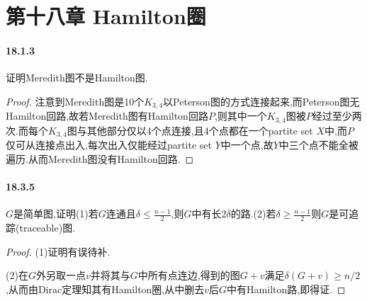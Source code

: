 \documentclass[11pt]{article}
\begin{document}
\section{第十八章\; Hamilton圈}
\paragraph{18.1.3}证明Meredith图不是Hamilton图. %
\begin{proof}
    注意到Meredith图是10个$K_{3,4}$以Peterson图的方式连接起来,而Peterson图无Hamilton回路,故若Meredith图有Hamilton回路$P$,则其中一个$K_{3,4}$图被$P$经过至少两次.而每个$K_{3,4}$图与其他部分仅以4个点连接,且4个点都在一个partite set $X$中,而$P$仅可从连接点出入,每次出入仅能经过partite set $Y$中一个点,故$Y$中三个点不能全被遍历.从而Meredith图没有Hamilton回路.
\end{proof}

\paragraph{18.3.5}$G$是简单图,证明(1)若$G$连通且$\delta\leq \frac{n-1}{2}$,则$G$中有长$2\delta$的路.(2)若$\delta\geq \frac{n-1}{2}$则$G$是可追踪(traceable)图.
\begin{proof}
    (1)证明有误待补.

    (2)在$G$外另取一点$v$并将其与$G$中所有点连边,得到的图$G+v$满足$\delta(G+v)\geq n/2$,从而由Dirac定理知其有Hamilton圈,从中删去$v$后$G$中有Hamilton路,即得证.
\end{proof}
\end{document}
